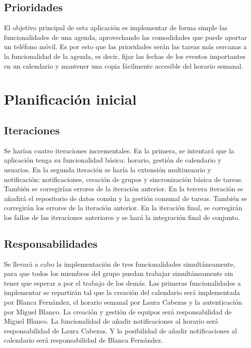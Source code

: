 \documentclass[a4paper,openright,12pt]{article}
\begin{document}
\subsection{Prioridades}
El objetivo principal de esta aplicación es implementar de forma simple las funcionalidades de una agenda, aprovechando las comodidades que puede aportar un teléfono móvil. Es por esto que las prioridades serán las tareas más cercanas a la funcionalidad de la agenda, es decir, fijar las fechas de los eventos importantes en un calendario y mantener una copia fácilmente accesible del horario semanal. 



\section{Planificación inicial}

\subsection{Iteraciones}
Se harían cuatro iteraciones incrementales. En la primera, se intentará que la aplicación tenga su funcionalidad básica: horario, gestión de calendario y usuarios.
En la segunda iteración se haría la extensión multiusuario y notificación: notificaciones, creación de grupos y sincronización básica de tareas. También se corregirían errores de la iteración anterior.
En la tercera iteración se añadirá el repositorio de datos común y la gestión comunal de tareas. También se corregirán los errores de la iteración anterior.
En la iteración final, se corregirán los fallos de las iteraciones anteriores y se hará la integración final de conjunto.

\subsection{Responsabilidades}
Se llevará a cabo la implementación de tres funcionalidades simultáneamente, para que todos los miembros del grupo puedan trabajar simultáneamente sin tener que esperar a por el trabajo de los demás. Las primeras funcionalidades a implementar se repartirán tal que 
la creación del calendario será implementada por Blanca Fernández, el horario semanal por Laura Cabezas y la autenticación por Miguel Blanco. 
\newline
La creación y gestión de equipos será responsabilidad de Miguel Blanco. La funcionalidad de añadir notificaciones al horario será responsabilidad de Laura Cabezas. Y la posibilidad de añadir notificaciones al calendario será responsabilidad de Blanca Fernández.
\end{document}
